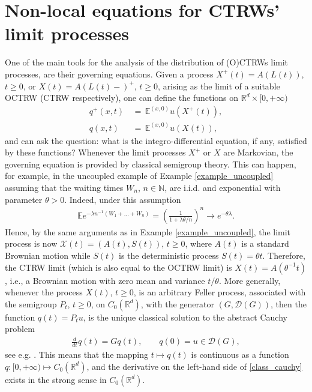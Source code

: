 \documentclass[reqno]{amsart}
\theoremstyle{remark}
\numberwithin{equation}{section} %
\newcommand{\RR}{\mathbb{R}}
\newcommand{\NN}{\mathbb{N}}
\newcommand{\1}{\mathds{1}}
\begin{document}
	\section{Non-local equations for CTRWs' limit processes}
	\label{sec3_non-local}
	One of the main tools for the analysis of the distribution of (O)CTRWs limit processes, are their governing equations. Given a process $X^+(t)=A(L(t))$, $t\ge0$, or $X(t)=A(L(t)-)^+$, $t\ge0$, arising as the limit of a suitable OCTRW (CTRW respectively), one can define the functions on $\RR^{d}\times [0,+\infty)$
	\begin{align}
		q^+(x,t) \, &= \, \mathds{E}^{(x,0)} u(X^+(t)),\\
		q(x,t) \, &= \, \mathds{E}^{(x,0)}u(X(t)),
	\end{align}
	and can ask the question: what is the integro-differential equation, if any, satisfied by these functions? Whenever the limit processes $X^+$ or $X$ are Markovian, the governing equation is provided by classical semigroup theory. This can happen, for example, in the uncoupled example of Example \ref{example_uncoupled} assuming that the waiting times $W_n$, $n\in\NN$, are i.i.d. and exponential with parameter $\theta>0$. Indeed, under this assumption 
	\begin{align}
		\mathds{E} e^{-\lambda n^{-1} (W_1 + \dots + W_n) } = \left( \frac{1}{1+\lambda \theta / n} \right)^n \to e^{-\theta \lambda}.
	\end{align}
	Hence, by the same arguments as in Example \ref{example_uncoupled}, the limit process is now $\mathcal{X}(t) = (A(t), S(t))$, $t \geq 0$, where $A(t)$ is a standard Brownian motion while $S(t)$ is the deterministic process $S(t) = \theta t$. Therefore, the CTRW limit (which is also equal to the OCTRW limit) is $X(t) = A(\theta^{-1}t)$, i.e., a Brownian motion with zero mean and variance $t/\theta$. More generally, whenever the process $X(t)$, $t\ge0$, is an arbitrary Feller process, associated with the semigroup $P_t$, $t \geq 0$, on $C_0(\mathbb{R}^d)$, with the generator $(G, \mathcal{D}(G) )$, then the function $q(t) = P_tu$, is the unique classical solution to the abstract Cauchy problem
	\begin{align}
		\frac{d}{dt} q(t) = Gq(t), \qquad q(0) = u \in \mathcal{D}(G),
		\label{class_cauchy}
	\end{align}
	see e.g. \cite[Proposition 3.1.9]{arendt2001cauchy}. This means that the mapping $t \mapsto q(t)$ is continuous as a function $q:[0, +\infty) \mapsto C_0 (\mathbb{R}^d)$, and the derivative on the left-hand side of \eqref{class_cauchy} exists in the strong sense in $C_0 (\mathbb{R}^d)$.
	
\end{document}
